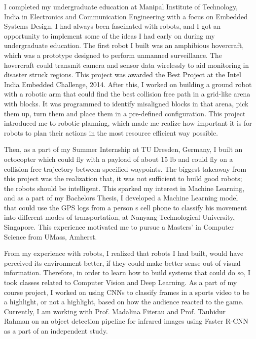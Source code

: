 \documentclass[11pt]{article}
\begin{document}
I completed my undergraduate education at Manipal Institute of Technology, India in Electronics and Communication Engineering with a focus on Embedded Systems Design. I had always been fascinated with robots, and I got an opportunity to implement some of the ideas I had early on during my undergraduate education. The first robot I built was an amphibious hovercraft, which was a prototype designed to perform unmanned surveillance. The hovercraft could transmit camera and sensor data wirelessly to aid monitoring in disaster struck regions. This project was awarded the Best Project at the Intel India Embedded Challenge, 2014. After this, I worked on building a ground robot with a robotic arm that could find the best collision free path in a grid-like arena with blocks. It was programmed to identify misaligned blocks in that arena, pick them up, turn them and place them in a pre-defined configuration. This project introduced me to robotic planning, which made me realize how important it is for robots to plan their actions in the most resource efficient way possible.
\par
\justify
Then, as a part of my Summer Internship at TU Dresden, Germany, I built an octocopter which could fly with a payload of about 15 lb and could fly on a collision free trajectory between specified waypoints. The biggest takeaway from this project was the realization that, it was not sufficient to build good robots; the robots should be intelligent. This sparked my interest in Machine Learning, and as a part of my Bachelor\textquotesingle s Thesis, I developed a Machine Learning model that could use the GPS logs from a person \textquotesingle s cell phone to classify his movement into different modes of transportation, at Nanyang Technological University, Singapore. This experience  motivated me to pursue a Masters' in Computer Science from UMass, Amherst.
\par
\justify
 From my experience with robots, I realized that robots I had built, would have perceived its environment better, if they could make better sense out of visual information. Therefore, in order to learn how to build systems that could do so, I took classes related to Computer Vision and Deep Learning. As a part of my course project, I worked on using CNNs to classify frames in a sports video to be a highlight, or not a highlight, based on how the audience reacted to the game. Currently, I am working with Prof. Madalina Fiterau and Prof. Tauhidur Rahman on an object detection pipeline for infrared images using Faster R-CNN as a part of an independent study. 
\end{document}
